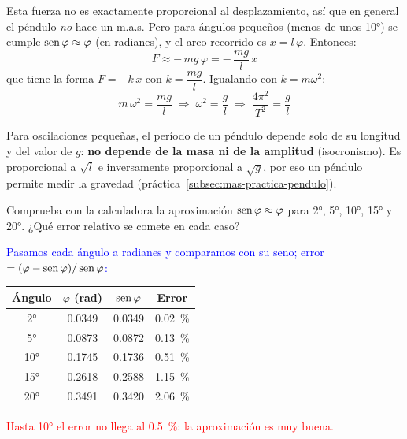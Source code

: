Esta fuerza no es exactamente proporcional al desplazamiento, así que en general el péndulo \emph{no} hace un m.a.s. Pero
para ángulos pequeños (menos de unos \ang{10}) se cumple \(\operatorname{sen}\varphi \approx \varphi\) (en radianes), y el arco recorrido es
\(x = l\,\varphi\). Entonces:
\begin{equation*}
    F \approx -\,m g\,\varphi = -\,\dfrac{m g}{l}\,x
\end{equation*}
que tiene la forma \(F = -k\,x\) con \(k = \dfrac{m g}{l}\). Igualando con \(k = m\omega^2\):
\begin{equation*}
    m\,\omega^2 = \dfrac{m g}{l} \;\Rightarrow\; \omega^2 = \dfrac{g}{l} \;\Rightarrow\; \dfrac{4\pi^2}{T^2} = \dfrac{g}{l}
\end{equation*}
\begin{centeredequation}
     \label{eq:mas-periodo-pendulo}
\end{centeredequation}

\begin{remark}
    Para oscilaciones pequeñas, el período de un péndulo depende solo de su longitud y del valor de \(g\): \textbf{no depende
    de la masa ni de la amplitud} (isocronismo). Es proporcional a \(\sqrt l\) e inversamente proporcional a \(\sqrt g\), por
    eso un péndulo permite medir la gravedad (práctica~\ref{subsec:mas-practica-pendulo}).
\end{remark}

\begin{exercise}
    Comprueba con la calculadora la aproximación \(\operatorname{sen}\varphi \approx \varphi\) para \ang{2}, \ang{5}, \ang{10}, \ang{15} y
    \ang{20}. ¿Qué error relativo se comete en cada caso?
    \begin{solu}
        \textcolor{blue}{Pasamos cada ángulo a radianes y comparamos con su seno; error \(= (\varphi - \operatorname{sen}\varphi)/\operatorname{sen}\varphi\):}
        \begin{center}
            \begin{tabular}{@{}cccc@{}}
                \toprule
                \textbf{Ángulo} & \(\varphi\) (\unit{\radian}) & \(\operatorname{sen}\varphi\) & \textbf{Error} \\
                \midrule
                \ang{2} & \num{0.0349} & \num{0.0349} & \qty{0.02}{\percent} \\[3pt]
                \ang{5} & \num{0.0873} & \num{0.0872} & \qty{0.13}{\percent} \\[3pt]
                \ang{10} & \num{0.1745} & \num{0.1736} & \qty{0.51}{\percent} \\[3pt]
                \ang{15} & \num{0.2618} & \num{0.2588} & \qty{1.15}{\percent} \\[3pt]
                \ang{20} & \num{0.3491} & \num{0.3420} & \qty{2.06}{\percent} \\
                \bottomrule
            \end{tabular}
        \end{center}
        \textcolor{red}{Hasta \ang{10} el error no llega al \qty{0.5}{\percent}: la aproximación es muy buena.}
    \end{solu}
\end{exercise}

